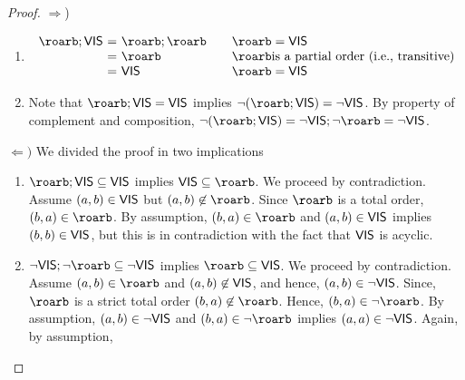 \begin{proof} $\Rightarrow$) 
\begin{enumerate}
\item
	\[ \begin{array}{l@{\ =\ }l@{\qquad}l}
		\roarb;\ovis &  \roarb;\roarb & \roarb =\ovis\\
		& \roarb & \roarb \mbox{is a partial order (i.e., transitive)}\\
		&  \ovis & \roarb =\ovis
   	\end{array}
	\]
\item Note that  $\roarb;\ovis =\ovis$ implies $\neg(\roarb;\ovis) =\neg\ovis$. By property of complement and composition, $\neg(\roarb;\ovis) =\neg\ovis;\neg\roarb =\neg\ovis$. 
\end{enumerate}

$\Leftarrow)$ We divided the proof in two implications
 \begin{enumerate}
    \item  $\roarb;\ovis \subseteq \ovis$ implies $\ovis\subseteq \roarb$. We proceed by contradiction. Assume $(a,b)\in\mathsf{\scriptsize{VIS}}$ but $(a,b)\not\in\roarb$.
    Since $\roarb$ is a total order, $(b,a)\in\roarb$. By assumption, $(b,a)\in\roarb$ and $(a,b)\in\mathsf{\scriptsize{VIS}}$ implies $(b,b)\in\mathsf{\scriptsize{VIS}}$, but this is in contradiction 
    with the fact that $\mathsf{\scriptsize{VIS}}$ is acyclic. 
        
    \item $\neg\ovis;\neg\roarb \subseteq \neg\ovis$ implies $\roarb\subseteq\ovis$. We proceed by contradiction. 
    Assume $(a,b)\in\roarb$ and $(a,b)\not\in\mathsf{\scriptsize{VIS}}$, and hence,  $(a,b)\in\neg\mathsf{\scriptsize{VIS}}$. Since,
    $\roarb$ is a strict total order $(b,a)\not\in\roarb$. Hence, $(b,a)\in\neg\roarb$. By assumption, $(a,b)\in\neg\mathsf{\scriptsize{VIS}}$ and $(b,a)\in\neg\roarb$ implies $(a,a)\in\neg\mathsf{\scriptsize{VIS}}$.
    Again, by assumption, 
 \end{enumerate}

\end{proof}

